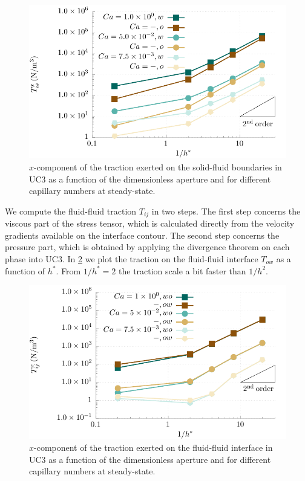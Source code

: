 \documentclass[]{article}
\begin{document}
\begin{figure}
\hypertarget{fig:drag_solid}{%
\centering
\includegraphics{figures/pdf/dragSolid.pdf}
\caption{\(x\)-component of the traction exerted on the solid-fluid
boundaries in UC3 as a function of the dimensionless aperture and for
different capillary numbers at steady-state.}\label{fig:drag_solid}
}
\end{figure}

We compute the fluid-fluid traction \(T_{ij}\) in two steps. The first
step concerns the viscous part of the stress tensor, which is calculated
directly from the velocity gradients available on the interface contour.
The second step concerns the pressure part, which is obtained by
applying the divergence theorem on each phase into UC3. In
\cref{fig:drag_fluidint} we plot the traction on the fluid-fluid
interface \(T_{ow}\) as a function of \(h^*\). From \(1/h^*=2\) the
traction scale a bit faster than \(1/h^2\).

\begin{figure}
\hypertarget{fig:drag_fluidint}{%
\centering
\includegraphics{figures/pdf/dragFluid.pdf}
\caption{\(x\)-component of the traction exerted on the fluid-fluid
interface in UC3 as a function of the dimensionless aperture and for
different capillary numbers at steady-state.}\label{fig:drag_fluidint}
}
\end{figure}
\end{document}
